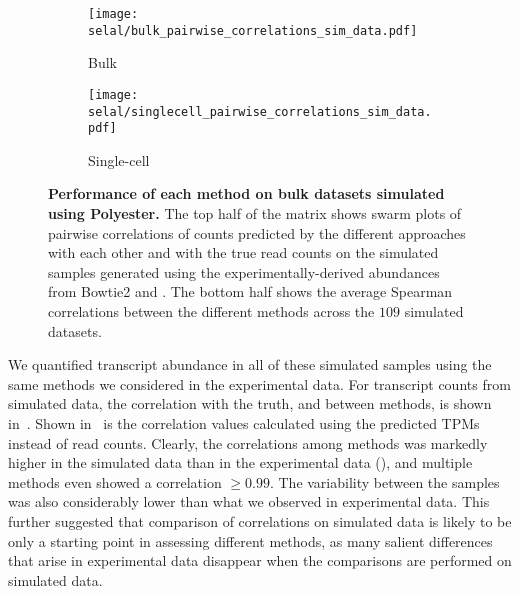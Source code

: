 \begin{figure}[t!]
    \centering
     \begin{subfigure}[t]{0.7\textwidth}
     \centering
  	  	\texttt{[image: selal/bulk\_pairwise\_correlations\_sim\_data.pdf]}
		\caption{Bulk}
    \end{subfigure}
     \begin{subfigure}[t]{0.7\textwidth}
     \centering
  	  	\texttt{[image: selal/singlecell\_pairwise\_correlations\_sim\_data.pdf]}
		\caption{Single-cell}
    \end{subfigure}
    \caption{\textbf{Performance of each method on bulk datasets simulated using Polyester.}
    The top half of the matrix shows swarm plots of pairwise correlations of counts predicted by the different approaches with each
      other and with the true read counts on the simulated samples generated
      using the experimentally-derived abundances from Bowtie2 and \salmon. The bottom half shows the
      average Spearman correlations between the different methods across the
      $109$ simulated datasets.}
     \label{fig:swarmsim}
\end{figure}

We quantified transcript abundance in all of
these simulated samples using the same methods we considered in the experimental
data. For transcript counts from simulated data, the correlation
with the truth, and between methods, is shown in~. Shown in~ is
the correlation values calculated using the predicted TPMs instead of read counts. Clearly, the correlations among
methods was markedly higher in the simulated data than in the experimental data (),
and multiple methods even showed a correlation $\ge 0.99$. The variability between
the samples was also considerably lower than what we observed in experimental
data. This further suggested that comparison of correlations on simulated data is
likely to be only a starting point in assessing different methods, as many
salient differences that arise in experimental data disappear when the
comparisons are performed on simulated data.

